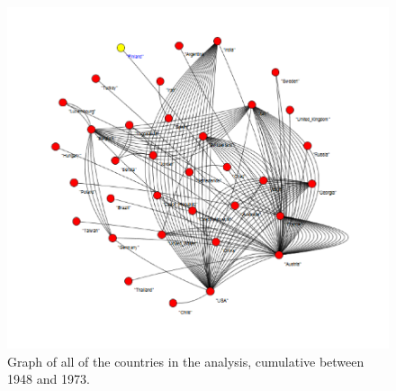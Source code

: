\documentclass{article} %
\begin{document}
\begin{figure}
  \centering
  \includegraphics{all-country-year-co-pubs-uranium-mining48-73.png}
  \caption{Graph of all of the countries in the analysis, cumulative between 1948 and 1973.}
  \label{fig:allcountry4873}
\end{figure}

\newpage
\thispagestyle{empty}
\mbox{}
\newpage
\end{document}
